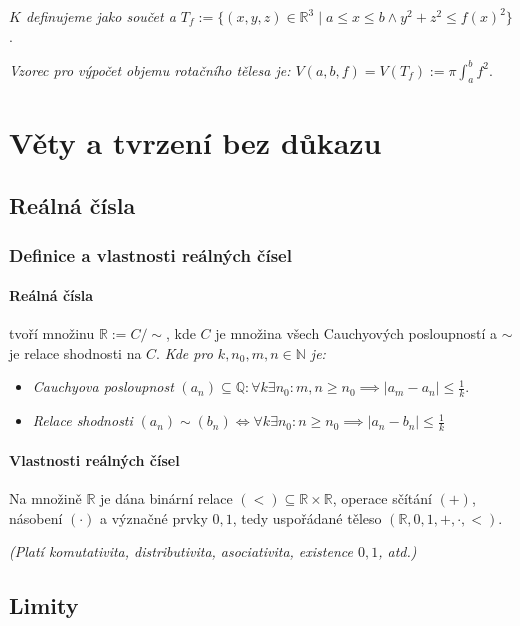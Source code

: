 \documentclass[10pt,a4paper]{article}
\newcommand{\N}{{\mathbb{N}}}
\newcommand{\Q}{{\mathbb{Q}}}
\newcommand{\R}{{\mathbb{R}}}
\begin{document}
\textit{$K$ definujeme jako součet a $T_f:= \{(x,y,z)\in \R^3 \mid a\leq x \leq b \land y^2 + z^2 \leq f(x)^2\}$}.

\textit{Vzorec pro výpočet objemu rotačního tělesa je: $\displaystyle V(a,b,f) = V(T_f):= \pi \int_{a}^{b} f^2 .$}
\newpage

\section{Věty a tvrzení bez důkazu}

\subsection{Reálná čísla}

\subsubsection{Definice a vlastnosti reálných čísel}
\paragraph*{Reálná čísla} tvoří množinu $\R:= C / \sim$, kde $C$ je množina všech Cauchyových posloupností a $\sim$ je relace shodnosti na $C$.
 \textit{Kde pro $k,n_0, m,n \in \N$ je:}
\begin{itemize}
    \item \textit{Cauchyova posloupnost} $(a_n) \subseteq \Q: \forall k \exists n_0: m,n \geq n_0 \implies |a_m - a_n| \leq \frac{1}{k}$.
    \item \textit{Relace shodnosti} $(a_n) \sim (b_n) \iff \forall k \exists n_0: n \geq n_0 \implies |a_n-b_n| \leq \frac{1}{k}$
\end{itemize}
\paragraph*{Vlastnosti reálných čísel} Na množině $\R$ je dána binární relace $(<) \subseteq \R \times \R$, operace sčítání $(+)$, násobení $(\cdot)$ a význačné prvky $0,1$, tedy uspořádané těleso $(\R, 0, 1, +, \cdot, <)$.

\textit{(Platí komutativita, distributivita, asociativita, existence $0,1$, atd.)}

\subsection{Limity}
\end{document}
